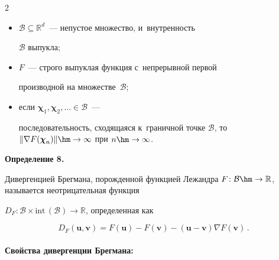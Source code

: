 \begin{multicols}{2}
\begin{itemize}

    \item $\mathcal{B} \subseteq \mathbb{R}^d$~--- непустое множество, и~внутренность

    $\mathcal{B}$ выпукла;

    \item $F$~--- строго выпуклая функция с~непрерывной первой

    производной на множестве~$\mathcal{B}$;

    \item если $\boldsymbol{\chi}_1, \boldsymbol{\chi}_2, \ldots \in \mathcal{B}$~---

    последовательность, сходящаяся к~граничной точке $\mathcal{B}$, то $\| \nabla F(\boldsymbol{\chi}_n) \| \hm\rightarrow

    \infty$ при $n \hm\rightarrow \infty$.

\end{itemize}








\noindent

\textbf{Определение 8.} %

Дивергенцией Брегмана, порожденной функцией Лежандра $F \colon \mathcal{B}

\hm\to \mathbb{R}$, называется неотрицательная функция

$D_F \colon \mathcal{B} \times

\mathrm{int}\,(\mathcal{B}) \to \mathbb{R}$, определенная как

$$

    D_F(\mathbf{u}, \mathbf{v}) = F(\mathbf{u}) - F(\mathbf{v}) -

    (\mathbf{u} - \mathbf{v}) \nabla F(\mathbf{v})\,.

$$





\paragraph*{Свойства дивергенции Брегмана:}

\end{multicols}
